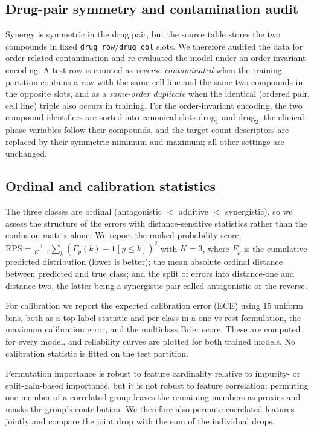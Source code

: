 \documentclass{bmcart}
\begin{document}
\subsection*{Drug-pair symmetry and contamination audit}
Synergy is symmetric in the drug pair, but the source table stores the two compounds in fixed
\texttt{drug\_row}/\texttt{drug\_col} slots. We therefore audited the data for order-related
contamination and re-evaluated the model under an order-invariant encoding. A test row is counted as
\emph{reverse-contaminated} when the training partition contains a row with the same cell line and the
same two compounds in the opposite slots, and as a \emph{same-order duplicate} when the identical
(ordered pair, cell line) triple also occurs in training. For the order-invariant encoding, the two
compound identifiers are sorted into canonical slots $\mathrm{drug}_1$ and $\mathrm{drug}_2$, the
clinical-phase variables follow their compounds, and the target-count descriptors are replaced by their
symmetric minimum and maximum; all other settings are unchanged.

\subsection*{Ordinal and calibration statistics}
The three classes are ordinal (antagonistic $<$ additive $<$ synergistic), so we assess the structure
of the errors with distance-sensitive statistics rather than the confusion matrix alone. We report the
ranked probability score, $\mathrm{RPS} = \frac{1}{K-1}\sum_{k}\left(F_{p}(k) - \mathbf{1}[y \leq
k]\right)^{2}$ with $K=3$, where $F_p$ is the cumulative predicted distribution (lower is better); the
mean absolute ordinal distance between predicted and true class; and the split of errors into
distance-one and distance-two, the latter being a synergistic pair called antagonistic or the reverse.

For calibration we report the expected calibration error (ECE) using $15$ uniform bins, both as a
top-label statistic and per class in a one-vs-rest formulation, the maximum calibration error, and the
multiclass Brier score. These are computed for every model, and reliability curves are plotted for both
trained models. No calibration statistic is fitted on the test partition.

Permutation importance is robust to feature cardinality relative to impurity- or split-gain-based
importance, but it is not robust to feature correlation: permuting one member of a correlated group
leaves the remaining members as proxies and masks the group's contribution. We therefore also permute
correlated features jointly and compare the joint drop with the sum of the individual drops.
\end{document}

